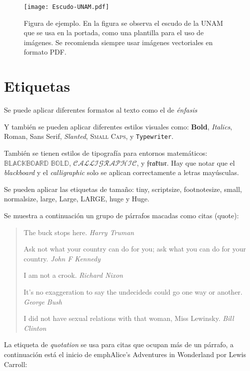 \documentclass[11pt,spanish]{report}
\begin{document}
\begin{figure}[htp]
\centering
\texttt{[image: Escudo-UNAM.pdf]}
\caption[Figura de ejemplo]{Figura de ejemplo. En la figura se observa el escudo de la UNAM que se usa en la portada, como una plantilla para el uso de imágenes. Se recomienda siempre usar imágenes vectoriales en formato PDF.}
\label{fig:figura_ejemplo}
\end{figure}


\section{Etiquetas}

Se puede aplicar diferentes formatos al texto como el de \emph{énfasis}

Y también se pueden aplicar diferentes estilos visuales como: \textbf{Bold}, \textit{Italics},
\textrm{Roman}, \textsf{Sans Serif}, \textsl{Slanted}, \textsc{Small Caps},
y \texttt{Typewriter}.

También se tienen estilos de tipografía para entornos matemáticos: $\mathbb{BLACKBOARD}$
$\mathbb{BOLD}$, $\mathcal{CALLIGRAPHIC}$, y $\mathfrak{fraktur}$. Hay que notar que el \emph{blackboard} y el \emph{calligraphic} solo se aplican correctamente a letras mayúsculas.

Se pueden aplicar las etiquetas de tamaño: {\tiny tiny}, {\scriptsize scriptsize},
{\footnotesize footnotesize}, {\small small}, {\normalsize normalsize},
{\large large}, {\Large Large}, {\LARGE LARGE}, {\huge huge} y {\Huge Huge}.

Se muestra a continuación un grupo de párrafos macadas como citas (quote):

\begin{quote}
The buck stops here. \emph{Harry Truman}

Ask not what your country can do for you; ask what you can do for your
country. \emph{John F Kennedy}

I am not a crook. \emph{Richard Nixon}

It's no exaggeration to say the undecideds could go one way or another.
\emph{George Bush}

I did not have sexual relations with that woman, Miss Lewinsky. \emph{Bill Clinton}
\end{quote}

La etiqueta de \emph{quotation} se usa para citas que ocupan más de un párrafo, a continuación está el inicio de emph{Alice's Adventures in Wonderland } por
Lewis Carroll:
\end{document}
